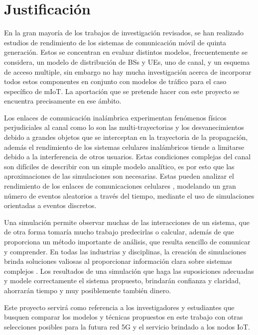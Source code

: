 \section{Justificación}

En la gran mayoría de los trabajos de investigación revisados, se han realizado estudios de rendimiento de los sistemas de comunicación móvil de quinta generación. Estos se concentran en evaluar distintos modelos, frecuentemente se considera, un modelo de distribución de BSs y UEs, uno de canal, y un esquema de acceso multiple, sin embargo no hay mucha investigación acerca de incorporar todos estos componentes en conjunto con modelos de tráfico para el caso específico de mIoT. La aportación que se pretende hacer con este proyecto se encuentra precisamente en ese ámbito.\newline

Los enlaces de comunicación inalámbrica experimentan fenómenos físicos perjudiciales al canal como lo son las multi-trayectorias y los desvanecimientos debido a grandes objetos que se interceptan en la trayectoria de la propagación, además el rendimiento de los sistemas celulares inalámbricos tiende a limitarse debido a la interferencia de otros usuarios. Estas condiciones complejas del canal son difíciles de describir con un simple modelo analítico, es por esto que las aproximaciones de las simulaciones son necesarias. Estas pueden analizar el rendimiento de los enlaces de comunicaciones celulares \parencite{WirelessSim}, modelando un gran número de eventos aleatorios a través del tiempo, mediante el uso de simulaciones orientadas a eventos discretos. \newline

Una simulación permite observar muchas de las interacciones de un sistema, que de otra forma tomaría mucho trabajo predecirlas o calcular, además de que proporciona un método importante de análisis, que resulta sencillo de comunicar y comprender. En todas las industrias y disciplinas, la creación de simulaciones brinda soluciones valiosas al proporcionar información clara sobre sistemas complejos \parencite{WirelessSim}. Los resultados de una simulación que haga las suposiciones adecuadas y modele correctamente el sistema propuesto, brindarán confianza y claridad, ahorrarán tiempo y muy posiblemente también dinero.\newline

Este proyecto servirá como referencia a los investigadores y estudiantes que busquen comparar los modelos y técnicas propuestos en este trabajo con otras selecciones posibles para la futura red 5G y el servicio brindado a los nodos IoT.\newline

